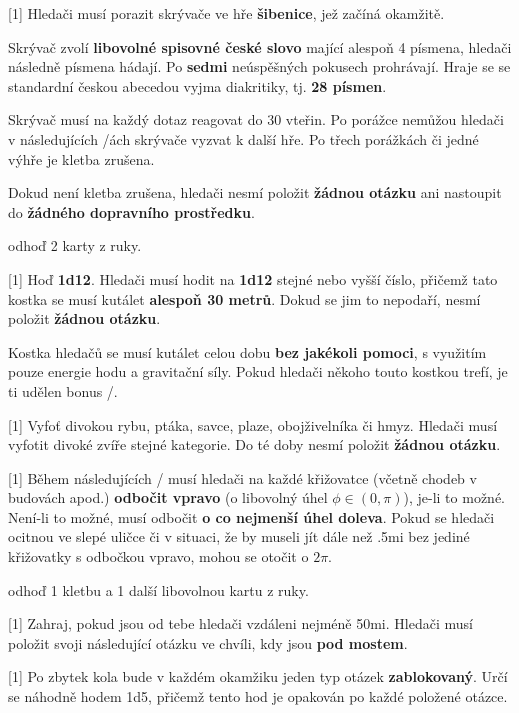 \begin{cards}
	 Hledači musí porazit skrývače ve hře \textbf{šibenice}, jež začíná okamžitě.

	Skrývač zvolí \textbf{libovolné spisovné české slovo} mající alespoň 4 písmena, hledači následně písmena hádají. Po \textbf{sedmi} neúspěšných pokusech prohrávají. Hraje se se standardní českou abecedou vyjma diakritiky, tj. \textbf{28 písmen}.

	Skrývač musí na každý dotaz reagovat do 30 vteřin. Po porážce nemůžou hledači v následujících \timecursehangmancooldown/ách skrývače vyzvat k další hře. Po třech porážkách či jedné výhře je kletba zrušena.

	Dokud není kletba zrušena, hledači nesmí položit \textbf{žádnou otázku} ani nastoupit do \textbf{žádného dopravního prostředku}.

	\cost odhoď 2 karty z ruky.

	 Hoď \textbf{1d12}. Hledači musí hodit na \textbf{1d12} stejné nebo vyšší číslo, přičemž tato kostka se musí kutálet \textbf{alespoň 30 metrů}. Dokud se jim to nepodaří, nesmí položit \textbf{žádnou otázku}.

	Kostka hledačů se musí kutálet celou dobu \textbf{bez jakékoli pomoci}, s využitím pouze energie hodu a gravitační síly. Pokud hledači někoho touto kostkou trefí, je ti udělen bonus \timecursetumblehit/.

	 Vyfoť divokou rybu, ptáka, savce, plaze, obojživelníka či hmyz. Hledači musí vyfotit divoké zvíře stejné kategorie. Do té doby nesmí položit \textbf{žádnou otázku}.

	 Během následujících \timecurseturnright/ musí hledači na každé křižovatce (včetně chodeb v budovách apod.) \textbf{odbočit vpravo} (o libovolný úhel $\phi \in (0, \pi)$), je-li to možné. Není-li to možné, musí odbočit \textbf{o co nejmenší úhel doleva}. Pokud se hledači ocitnou ve slepé uličce či v situaci, že by museli jít dále než \dist.5mi bez jediné křižovatky s odbočkou vpravo, mohou se otočit o $2\pi$.

	\cost odhoď 1 kletbu a 1 další libovolnou kartu z ruky.

	 Zahraj, pokud jsou od tebe hledači vzdáleni nejméně \dist50mi. Hledači musí položit svoji následující otázku ve chvíli, kdy jsou \textbf{pod mostem}.

	 Po zbytek kola bude v každém okamžiku jeden typ otázek \textbf{zablokovaný}. Určí se náhodně hodem 1d5, přičemž tento hod je opakován po každé položené otázce.


\end{cards}
